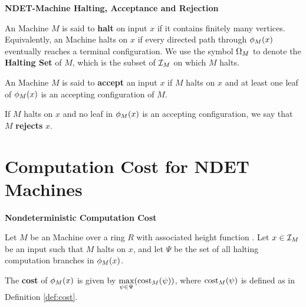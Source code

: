
\begin{definition} \textbf{NDET-Machine Halting, Acceptance and Rejection}

  An \ndet Machine $M$ is said to \textbf{halt} on input $x$ if it
  contains finitely many vertices.  Equivalently, an \ndet Machine
  halts on $x$ if every directed path through $\phi_M(x)$
  eventually reaches a terminal configuration.  We use the symbol
  $\Omega_M$ to denote the \textbf{Halting Set} of $M$, which is the
  subset of $\mathcal{I}_M$ on which $M$ halts.
  
  An \ndet Machine $M$ is said to \textbf{accept} an input $x$ if $M$
  halts on $x$ and at least one leaf of $\phi_M(x)$ is an
  accepting configuration of $M$.

  If $M$ halts on $x$ and no leaf in $\phi_M(x)$ is an accepting
  configuration, we say that $M$ \textbf{rejects} $x$.
  
\end{definition}

\section{Computation Cost for  NDET Machines}

\begin{definition}{\textbf{Nondeterministic Computation Cost}}

  Let $M$ be an \ndet Machine over a ring $R$ with associated height
  function .  Let $x \in \mathcal{I}_M$ be an
  input such that $M$ halts on $x$, and let $\Psi$ be the set of all
  halting computation branches in $\phi_M(x)$.

  The \textbf{cost} of $\phi_M(x)$ is given by $\max\limits_{\psi
    \in \Psi}(\text{cost}_M(\psi))$, where $\text{cost}_M(\psi)$ is defined as in
  Definition \ref{def:cost}.

\end{definition}

